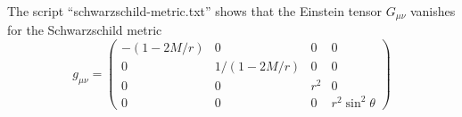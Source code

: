 \documentclass[12pt]{article}
\begin{document}
\noindent
The script ``schwarzschild-metric.txt'' shows that the
Einstein tensor $G_{\mu\nu}$ vanishes for the Schwarzschild metric
$$
g_{\mu\nu}=
\begin{pmatrix}
-(1-2M/r) & 0 & 0 & 0\\
0 & 1/(1-2M/r) & 0 & 0\\
0 & 0 & r^2 & 0\\
0 & 0 & 0 & r^2\sin^2\theta
\end{pmatrix}
$$
\end{document}
